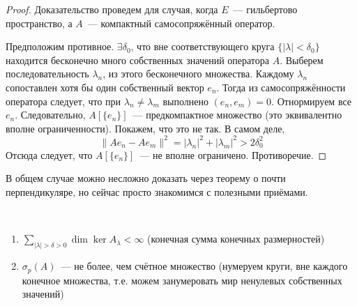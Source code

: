 \begin{proof}
    Доказательство проведем для случая, когда $E$~--- гильбертово пространство, а $A$~--- компактный самосопряжённый оператор. 

    Предположим противное. $\exists \delta_0$, что вне соответствующего круга $\{|\lambda| < \delta_0\}$ находится бесконечно много собственных значений оператора $A$. Выберем последовательность $\lambda_n$, из этого бесконечного множества. 
    Каждому $\lambda_n$ сопоставлен хотя бы один собственный вектор $e_n$. Тогда из самосопряжённости оператора следует, что при $\lambda_n \neq \lambda_m$ выполнено $(e_n, e_m) = 0$. Отнормируем все $e_n$. 
    Следовательно, $A[\{e_n\}]$~--- предкомпактное множество (это эквивалентно вполне ограниченности).
    Покажем, что это не так. В самом деле, 
    \[\|Ae_n - Ae_m\|^2 = |\lambda_n|^2 + |\lambda_m|^2 > 2 \delta_0^2\]
    Отсюда следует, что $A[\{e_n\}]$~--- не вполне ограничено. Противоречие.
\end{proof}

\begin{lemmanote}
    В общем случае можно несложно доказать через теорему о почти перпендикуляре, но сейчас просто знакомимся с полезными приёмами.
\end{lemmanote}

\begin{corollary}
    \(\)
    \begin{enumerate}
        \item 
        \(
        \sum \limits_{|\lambda| > \delta > 0} \dim \ker A_{\lambda} < \infty
        \) (конечная сумма конечных размерностей)

        \item $\sigma_p(A)$~--- не более, чем счётное множество (нумеруем круги, вне каждого конечное множества, т.е. можем занумеровать мир ненулевых собственных значений)
    \end{enumerate}
\end{corollary}